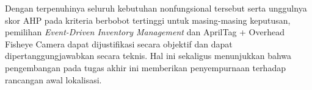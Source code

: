 Dengan terpenuhinya seluruh kebutuhan nonfungsional tersebut serta unggulnya skor AHP pada kriteria berbobot tertinggi untuk masing-masing keputusan, pemilihan \textit{Event-Driven Inventory Management} dan AprilTag + Overhead Fisheye Camera dapat dijustifikasi secara objektif dan dapat dipertanggungjawabkan secara teknis. Hal ini sekaligus menunjukkan bahwa pengembangan pada tugas akhir ini memberikan penyempurnaan terhadap rancangan awal lokalisasi.
